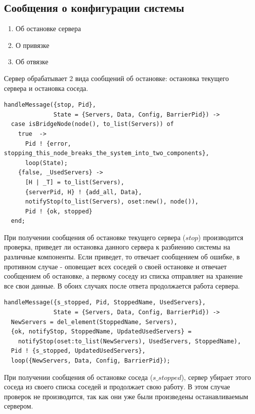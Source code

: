 		\subsection{Сообщения о конфигурации системы}
			\begin{enumerate}
				\item Об остановке сервера
				\item О привязке
				\item Об отвязке	
			\end{enumerate}
			Сервер обрабатывает 2 вида сообщений об остановке: остановка текущего сервера и остановка соседа. 
			
			\begin{lstlisting}
handleMessage({stop, Pid}, 
              State = {Servers, Data, Config, BarrierPid}) -> 
  case isBridgeNode(node(), to_list(Servers)) of
    true  -> 
	  Pid ! {error, stopping_this_node_breaks_the_system_into_two_components},
      loop(State);
    {false, _UsedServers} ->
	  [H | _T] = to_list(Servers),
      {serverPid, H} ! {add_all, Data},
      notifyStop(to_list(Servers), oset:new(), node()),    
      Pid ! {ok, stopped}
  end;				
			\end{lstlisting}
			При получении сообщения об остановке текущего сервера ($stop$) производится проверка, приведет ли остановка данного сервера к разбиению системы на различные компоненты. 
			Если приведет, то отвечает сообщением об ошибке, в противном случае - оповещает всех соседей о своей остановке и отвечает сообщением об остановке, а первому соседу из списка 
			отправляет на хранение все свои данные. В обоих случаях после ответа продолжается работа сервера.

			\begin{lstlisting}
handleMessage({s_stopped, Pid, StoppedName, UsedServers}, 
              State = {Servers, Data, Config, BarrierPid}) ->
  NewServers = del_element(StoppedName, Servers),
  {ok, notifyStop, StoppedName, UpdatedUsedServers} = 
    notifyStop(oset:to_list(NewServers), UsedServers, StoppedName),
  Pid ! {s_stopped, UpdatedUsedServers},
  loop({NewServers, Data, Config, BarrierPid});				
			\end{lstlisting}
			При получении сообщения об остановке соседа ($s\_stopped$), сервер убирает этого соседа из своего списка соседей и продолжает свою работу. В этом случае проверок не производится, 
			так как они уже были произведены останавливаемым сервером. 

